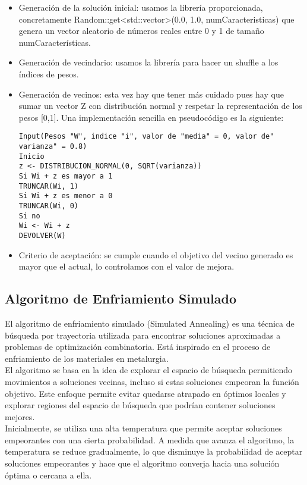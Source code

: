 \begin{itemize}
	\item Generación de la solución inicial: usamos la librería  proporcionada, concretamente Random::get<std::vector>(0.0, 1.0, numCaracteristicas) que genera un vector aleatorio de números reales entre 0 y 1 de tamaño numCaracterísticas.
	\item Generación de vecindario: usamos la librería  para hacer un shuffle a los índices de pesos.
	\item Generación de vecinos: esta vez hay que tener más cuidado pues hay que sumar un vector Z con distribución normal y respetar la representación de los pesos [0,1]. Una implementación sencilla en pseudocódigo es la siguiente:
	\begin{verbatim}
Input(Pesos "W", indice "i", valor de "media" = 0, valor de" varianza" = 0.8)
Inicio
z <- DISTRIBUCION_NORMAL(0, SQRT(varianza))
Si Wi + z es mayor a 1
TRUNCAR(Wi, 1)
Si Wi + z es menor a 0
TRUNCAR(Wi, 0)
Si no
Wi <- Wi + z
DEVOLVER(W)
	\end{verbatim}
	
	\item Criterio de aceptación: se cumple cuando el objetivo del vecino generado es mayor que el actual, lo controlamos con el valor de mejora.
\end{itemize}

\newpage

\subsection{Algoritmo de Enfriamiento Simulado}
El algoritmo de enfriamiento simulado (Simulated Annealing) es una técnica de búsqueda por trayectoria utilizada para encontrar soluciones aproximadas a problemas de optimización combinatoria. Está inspirado en el proceso de enfriamiento de los materiales en metalurgia.\\

El algoritmo se basa en la idea de explorar el espacio de búsqueda permitiendo movimientos a soluciones vecinas, incluso si estas soluciones empeoran la función objetivo. Este enfoque permite evitar quedarse atrapado en óptimos locales y explorar regiones del espacio de búsqueda que podrían contener soluciones mejores.\\

Inicialmente, se utiliza una alta temperatura que permite aceptar soluciones empeorantes con una cierta probabilidad. A medida que avanza el algoritmo, la temperatura se reduce gradualmente, lo que disminuye la probabilidad de aceptar soluciones empeorantes y hace que el algoritmo converja hacia una solución óptima o cercana a ella.\\

